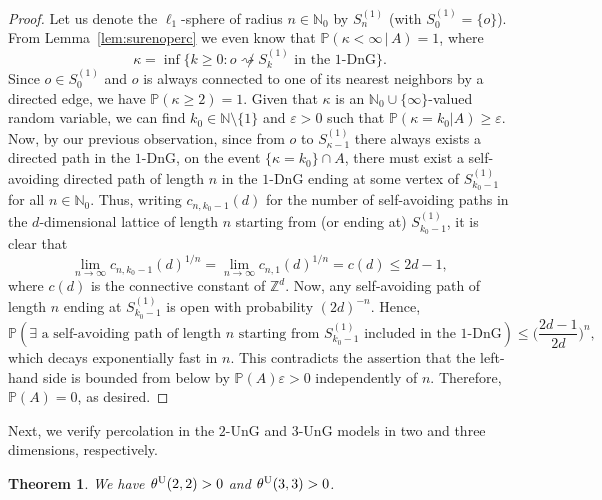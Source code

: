 \documentclass[oneside]{amsart}
\newcommand{\N}{\mathbb{N}}
\newtheorem{theorem}{Theorem}[section]
\theoremstyle{definition}
\renewcommand{\P}{\mathbb{P}}
\newcommand{\1}{\mathbbm{1}}
\newcommand{\0}{\mathbf{o}}
\newcommand{\Z}{\mathbb{Z}}
\newcommand{\basc}[1]{{\color{blue}{ \bf [~Bas:\ }\emph{#1}\textbf{~]}}}
\numberwithin{equation}{section}
\begin{document}
\begin{proof}
Let us denote the $\ell_1$-sphere of radius $n\in\N_0$ by $S^{(1)}_n$ (with $S^{(1)}_0=\{o\}$). From Lemma~\ref{lem:surenoperc} we even know that $\P(\kappa<\infty\,|\,A)=1$, where
\[ \kappa = \inf \big\{ k \geq 0 \colon o \not\rightsquigarrow S^{(1)}_k \text{ in the $1$-DnG} \big\}. \]
Since $o \in S_0^{(1)}$ and $o$ is always connected to one of its nearest neighbors by a directed edge, we have $\P(\kappa \geq 2)=1$.
Given that $\kappa$ is an $\N_0 \cup \{\infty\}$-valued random variable, we can find $k_0\in\N \setminus \{ 1 \}$ and $\varepsilon>0$ such that $\P(\kappa =  k_0 |A) \geq \varepsilon$.  Now, by our previous observation, since from $o$ to $S^{(1)}_{\kappa-1}$ there always exists a directed path in the $1$-DnG, 
on the event $\{ \kappa = k_0 \} \cap A$, there must exist a self-avoiding directed path of length $n$ in the $1$-DnG ending at some vertex of $S^{(1)}_{k_0-1}$  for all $n\in\N_0$. %
Thus, writing $c_{n,k_0-1}(d)$ for the number of self-avoiding paths in the $d$-dimensional lattice of length $n$ starting from (or ending at) $S^{(1)}_{k_0-1}$, it is clear that
\[ \lim_{n\to\infty} c_{n,k_0-1}(d)^{1/n} = \lim_{n\to\infty} c_{n,1}(d)^{1/n}=c(d) \leq 2d-1, \]
where $c(d)$ is the connective constant of $\Z^d$. Now, any self-avoiding path of length $n$ ending at $S^{(1)}_{k_0-1}$ is open with probability $(2d)^{-n}$. Hence,
\[ \P(\exists\text{ a self-avoiding path of length $n$ starting from $S^{(1)}_{k_0-1}$ included in the $1$-DnG}) \leq \Big( \frac{2d-1}{2d} \Big)^n, \]
which decays exponentially fast in $n$. This contradicts the assertion that the left-hand side is bounded from below by $\P(A)\varepsilon>0$ independently of $n$. Therefore, $\P(A)=0$, as desired.
\end{proof}

Next, we verify percolation in the $2$-UnG and $3$-UnG models in two and three dimensions, respectively.

\begin{theorem}\label{theorem-U22}
  We have $\theta^{\rm U}(2,2)>0$ and $\theta^{\rm U}(3,3)>0$.  
\end{theorem}
\end{document}
